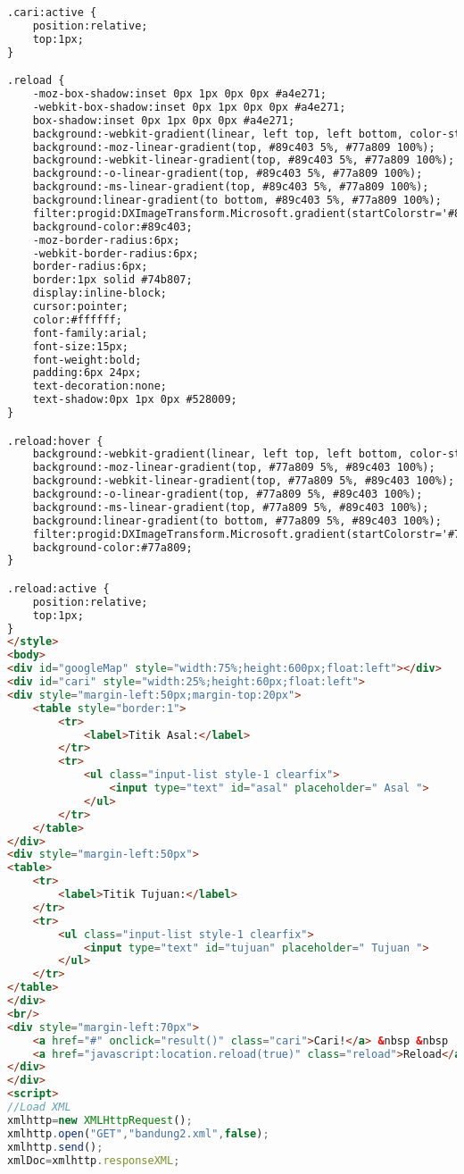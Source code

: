 \begin{lstlisting}[language=HTML,basicstyle=\tiny,caption=aplikasi.html]
.cari:active {
	position:relative;
	top:1px;
}

.reload {
	-moz-box-shadow:inset 0px 1px 0px 0px #a4e271;
	-webkit-box-shadow:inset 0px 1px 0px 0px #a4e271;
	box-shadow:inset 0px 1px 0px 0px #a4e271;
	background:-webkit-gradient(linear, left top, left bottom, color-stop(0.05, #89c403), color-stop(1, #77a809));
	background:-moz-linear-gradient(top, #89c403 5%, #77a809 100%);
	background:-webkit-linear-gradient(top, #89c403 5%, #77a809 100%);
	background:-o-linear-gradient(top, #89c403 5%, #77a809 100%);
	background:-ms-linear-gradient(top, #89c403 5%, #77a809 100%);
	background:linear-gradient(to bottom, #89c403 5%, #77a809 100%);
	filter:progid:DXImageTransform.Microsoft.gradient(startColorstr='#89c403', endColorstr='#77a809',GradientType=0);
	background-color:#89c403;
	-moz-border-radius:6px;
	-webkit-border-radius:6px;
	border-radius:6px;
	border:1px solid #74b807;
	display:inline-block;
	cursor:pointer;
	color:#ffffff;
	font-family:arial;
	font-size:15px;
	font-weight:bold;
	padding:6px 24px;
	text-decoration:none;
	text-shadow:0px 1px 0px #528009;
}

.reload:hover {
	background:-webkit-gradient(linear, left top, left bottom, color-stop(0.05, #77a809), color-stop(1, #89c403));
	background:-moz-linear-gradient(top, #77a809 5%, #89c403 100%);
	background:-webkit-linear-gradient(top, #77a809 5%, #89c403 100%);
	background:-o-linear-gradient(top, #77a809 5%, #89c403 100%);
	background:-ms-linear-gradient(top, #77a809 5%, #89c403 100%);
	background:linear-gradient(to bottom, #77a809 5%, #89c403 100%);
	filter:progid:DXImageTransform.Microsoft.gradient(startColorstr='#77a809', endColorstr='#89c403',GradientType=0);
	background-color:#77a809;
}

.reload:active {
	position:relative;
	top:1px;
}
</style>
<body>
<div id="googleMap" style="width:75%;height:600px;float:left"></div>
<div id="cari" style="width:25%;height:60px;float:left">
<div style="margin-left:50px;margin-top:20px">
	<table style="border:1">
		<tr>
			<label>Titik Asal:</label>
		</tr>
		<tr>
			<ul class="input-list style-1 clearfix">
				<input type="text" id="asal" placeholder=" Asal ">
			</ul>
		</tr>
	</table>
</div>
<div style="margin-left:50px">
<table>
	<tr>
		<label>Titik Tujuan:</label>
	</tr>
	<tr>
		<ul class="input-list style-1 clearfix">
            <input type="text" id="tujuan" placeholder=" Tujuan ">
        </ul>
	</tr>
</table>
</div>
<br/>
<div style="margin-left:70px">
	<a href="#" onclick="result()" class="cari">Cari!</a> &nbsp &nbsp
	<a href="javascript:location.reload(true)" class="reload">Reload</a>
</div>
</div>
<script>
//Load XML
xmlhttp=new XMLHttpRequest();
xmlhttp.open("GET","bandung2.xml",false);
xmlhttp.send();
xmlDoc=xmlhttp.responseXML;


\end{lstlisting}

